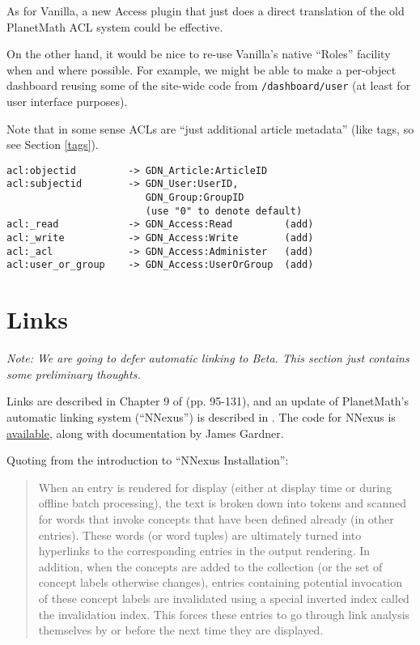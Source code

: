 \documentclass{article}
\begin{document}
As for Vanilla, a new Access plugin that just does a
direct translation of the old PlanetMath ACL system could
be effective.

On the other hand, it would be nice to re-use Vanilla's
native ``Roles'' facility when and where possible.  For
example, we might be able to make a per-object dashboard
reusing some of the site-wide code from
\verb|/dashboard/user| (at least for user interface
purposes).

Note that in some sense ACLs are ``just additional article
metadata'' (like tags, so see Section \ref{tags}).

\begin{verbatim}
acl:objectid         -> GDN_Article:ArticleID
acl:subjectid        -> GDN_User:UserID,
                        GDN_Group:GroupID
                        (use "0" to denote default)
acl:_read            -> GDN_Access:Read         (add)
acl:_write           -> GDN_Access:Write        (add)
acl:_acl             -> GDN_Access:Administer   (add)
acl:user_or_group    -> GDN_Access:UserOrGroup  (add)
\end{verbatim}

\section{Links}

\emph{Note: We are going to defer automatic linking to
  Beta.  This section just contains some preliminary
  thoughts.}

Links are described in Chapter 9 of \cite{KrowneThesis}
(pp. 95-131), and an update of PlanetMath's automatic
linking system (``NNexus'') is described in \cite{NNexus}.
The code for NNexus is
\href{http://code.google.com/p/nnexus/source/checkout}{available},
along with documentation by James Gardner.

Quoting from the introduction to ``NNexus Installation'':

\begin{quotation}
\noindent When an entry is rendered for display (either at
display time or during offline batch processing), the text
is broken down into tokens and scanned for words that
invoke concepts that have been defined already (in other
entries).  These words (or word tuples) are ultimately
turned into hyperlinks to the corresponding entries in the
output rendering.  In addition, when the concepts are
added to the collection (or the set of concept labels
otherwise changes), entries containing potential
invocation of these concept labels are invalidated using a
special inverted index called the invalidation index.
This forces these entries to go through link analysis
themselves by or before the next time they are displayed.
\end{quotation}
\end{document}
